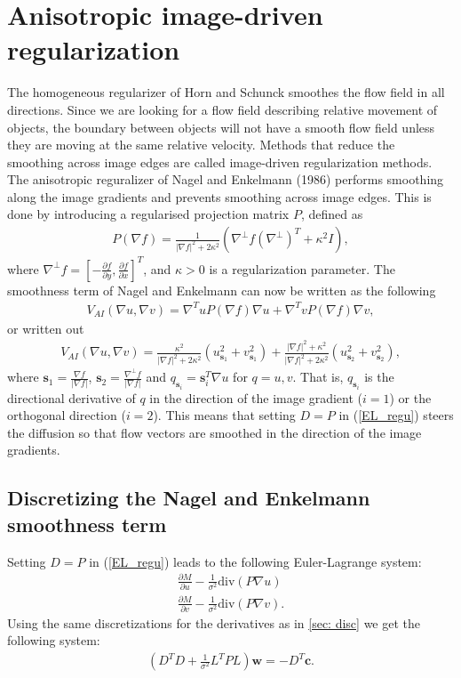 \documentclass[10pt,a4paper]{article}
\begin{document}
\section{Anisotropic image-driven regularization}
The homogeneous regularizer of Horn and Schunck smoothes the flow field in all directions. Since we are looking for a flow field describing relative movement of objects, the boundary between objects will not have a smooth flow field unless they are moving at the same relative velocity. Methods that reduce the smoothing across image edges are called image-driven regularization methods. The anisotropic reguralizer of Nagel and Enkelmann (1986) performs smoothing along the image gradients and prevents smoothing across image edges. This is done by introducing a regularised projection matrix $P$, defined as
\begin{align*}
P(\nabla f) = \frac{1}{|\nabla f|^2 + 2 \kappa^2} (\nabla^{\bot} f (\nabla^{\bot})^T + \kappa^2 I),
\end{align*}
where $\nabla^{\bot} f= \left[-\frac{\partial f}{\partial y}, \frac{\partial f}{\partial x}\right]^T$, and $\kappa > 0$ is a regularization parameter. The smoothness term of Nagel and Enkelmann can now be written as the following
\begin{align*}
V_{AI}(\nabla u, \nabla v) = \nabla ^T u P(\nabla f) \nabla u + \nabla ^T v P(\nabla f) \nabla v,
\end{align*}
or written out 
\begin{align*}
V_{AI}(\nabla u, \nabla v) = \frac{\kappa^2}{|\nabla f|^2 + 2 \kappa^2} \left( u_{\textbf{s}_1}^2 + v_{\textbf{s}_1}^2 \right) + \frac{|\nabla f|^2 + \kappa^2}{|\nabla f|^2 + 2 \kappa^2} \left(u_{\textbf{s}_2}^2 + v_{\textbf{s}_2}^2 \right),
\end{align*}
where $\textbf{s}_1 = \frac{\nabla f}{|\nabla f|}$, $\textbf{s}_2 = \frac{\nabla^{\bot} f}{|\nabla f|}$ and $q_{\textbf{s}_i} = \textbf{s}_i^T \nabla u$ for $q = u, v$. That is, $q_{\textbf{s}_i}$ is the directional derivative of $q$ in the direction of the image gradient ($i=1$) or the orthogonal direction ($i=2$). This means that setting $D=P$ in (\ref{EL_regu}) steers the diffusion so that flow vectors are smoothed in the direction of the image gradients.

\subsection{Discretizing the Nagel and Enkelmann smoothness term}
Setting $D=P$ in (\ref{EL_regu}) leads to the following Euler-Lagrange system:
\begin{align*}
\frac{\partial M}{\partial u} - \frac{1}{\sigma^2} \text{div}(P \nabla u) \\
\frac{\partial M}{\partial v} - \frac{1}{\sigma^2} \text{div}(P \nabla v).
\end{align*}
Using the same discretizations for the derivatives as in \ref{sec: disc} we get the following system:
\begin{align*}
(D^T D + \frac{1}{\sigma^2} L^TPL) \textbf{w} = - D^T \textbf{c}.
\end{align*}
\end{document}
